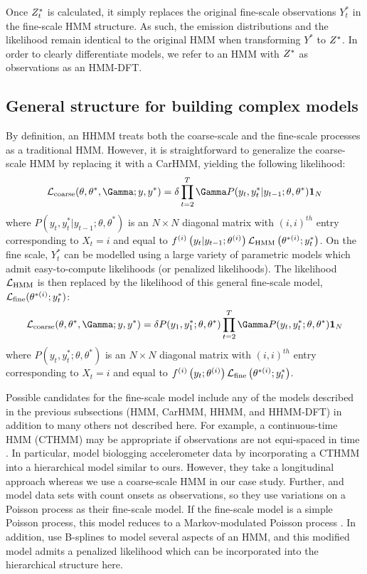 Once $Z^*_t$ is calculated, it simply replaces the original fine-scale observations $Y^*_t$ in the fine-scale HMM structure. As such, the emission distributions and the likelihood remain identical to the original HMM when transforming $Y^*$ to $Z^*$. In order to clearly differentiate models, we refer to an HMM with $Z^*$ as observations as an HMM-DFT.

\subsection{General structure for building complex models}

By definition, an HHMM treats both the coarse-scale and the fine-scale processes as a traditional HMM. However, it is straightforward to generalize the coarse-scale HMM by replacing it with a CarHMM, yielding the following likelihood:
\[
\calL_{\text{coarse}}(\theta,\theta^*,\Gamma;y,y^*) = \delta \prod_{t=2}^T \Gamma P(y_t,y^*_t|y_{t-1};\theta,\theta^*) \mathbf{1}_N
\]
where $P(y_t,y^*_t|y_{t-1};\theta,\theta^*) $ is an $N \times N$ diagonal matrix with $(i,i)^{th}$ entry corresponding to $X_t=i$ and equal to $f^{(i)}\left(y_t|y_{t-1};\theta^{(i)}\right)\mathcal{L}_{\text{HMM}}\left(\theta^{*(i)};y^*_t\right)$. 
On the fine scale, $Y^*_t$ can be modelled using a large variety of parametric models which admit easy-to-compute likelihoods (or penalized likelihoods). The likelihood $\mathcal{L}_{\text{HMM}}$ is then replaced by the likelihood of this general fine-scale model, $\mathcal{L}_{\text{fine}}(\theta^{*(i)};y^*_t)$:
\[
\calL_{\text{coarse}}(\theta,\theta^*,\Gamma;y,y^*) = \delta P(y_1,y^*_1;\theta,\theta^*) \prod_{t=2}^T \Gamma P(y_t,y^*_t;\theta,\theta^*) \mathbf{1}_N
\]
where $P(y_t,y^*_t;\theta,\theta^*) $ is an $N \times N$ diagonal matrix with $(i,i)^{th}$ entry corresponding to $X_t=i$ and equal to $f^{(i)}\left(y_t;\theta^{(i)}\right)\mathcal{L}_{\text{fine}}\left(\theta^{*(i)};y^*_t\right)$. 

Possible candidates for the fine-scale model include any of the models described in the previous subsections (HMM, CarHMM, HHMM, and HHMM-DFT) in addition to many others not described here. 
For example, a continuous-time HMM (CTHMM) may be appropriate if observations are not equi-spaced in time \citep{Liu:2015}. In particular, \citet{Xu:2018} model biologging accelerometer data by incorporating a CTHMM into a hierarchical model similar to ours. However, they take a longitudinal approach whereas we use a coarse-scale HMM in our case study.
Further, \citet{Bebbington:2007} and \citet{Borchers:2013} model data sets with count onsets as observations, so they use variations on a Poisson process as their fine-scale model. If the fine-scale model is a simple Poisson process, this model reduces to a Markov-modulated Poisson process \citep{Fischer:1993}.
In addition, \citep{Langrock:2018} use B-splines to model several aspects of an HMM, and this modified model admits a penalized likelihood which can be incorporated into the hierarchical structure here. 

